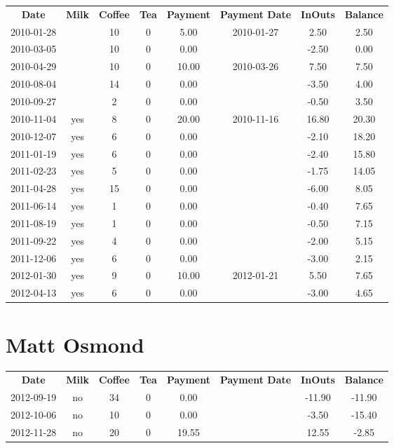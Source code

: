 \begin{center}
\begin{tabular}{cccccccc}
\textbf{Date} & \textbf{Milk} & \textbf{Coffee} & \textbf{Tea} & \textbf{Payment} & \textbf{Payment Date} & \textbf{InOuts} & \textbf{Balance} \\
2010-01-28 &  & 10 & 0 &  5.00 & 2010-01-27 &  2.50 &  2.50\\ 
2010-03-05 &  & 10 & 0 &  0.00 &  & -2.50 &  0.00\\ 
2010-04-29 &  & 10 & 0 & 10.00 & 2010-03-26 &  7.50 &  7.50\\ 
2010-08-04 &  & 14 & 0 &  0.00 &  & -3.50 &  4.00\\ 
2010-09-27 &  &  2 & 0 &  0.00 &  & -0.50 &  3.50\\ 
2010-11-04 & yes &  8 & 0 & 20.00 & 2010-11-16 & 16.80 & 20.30\\ 
2010-12-07 & yes &  6 & 0 &  0.00 &  & -2.10 & 18.20\\ 
2011-01-19 & yes &  6 & 0 &  0.00 &  & -2.40 & 15.80\\ 
2011-02-23 & yes &  5 & 0 &  0.00 &  & -1.75 & 14.05\\ 
2011-04-28 & yes & 15 & 0 &  0.00 &  & -6.00 &  8.05\\ 
2011-06-14 & yes &  1 & 0 &  0.00 &  & -0.40 &  7.65\\ 
2011-08-19 & yes &  1 & 0 &  0.00 &  & -0.50 &  7.15\\ 
2011-09-22 & yes &  4 & 0 &  0.00 &  & -2.00 &  5.15\\ 
2011-12-06 & yes &  6 & 0 &  0.00 &  & -3.00 &  2.15\\ 
2012-01-30 & yes &  9 & 0 & 10.00 & 2012-01-21 &  5.50 &  7.65\\ 
2012-04-13 & yes &  6 & 0 &  0.00 &  & -3.00 &  4.65
\end{tabular}
\end{center}

\section{Matt Osmond}

\begin{center}
\begin{tabular}{cccccccc}
\textbf{Date} & \textbf{Milk} & \textbf{Coffee} & \textbf{Tea} & \textbf{Payment} & \textbf{Payment Date} & \textbf{InOuts} & \textbf{Balance} \\
2012-09-19 & no & 34 & 0 &  0.00 &  & -11.90 & -11.90\\ 
2012-10-06 & no & 10 & 0 &  0.00 &  &  -3.50 & -15.40\\ 
2012-11-28 & no & 20 & 0 & 19.55 &  &  12.55 &  -2.85
\end{tabular}
\end{center}

